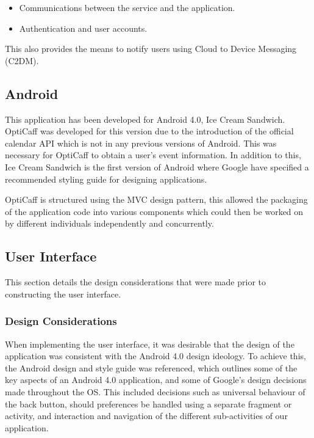 \begin{itemize}[noitemsep,leftmargin=1cm]
	\item{Communications between the service and the application.}
	\item{Authentication and user accounts.}
\end{itemize}

This also provides the means to notify users using Cloud to Device Messaging (C2DM).            

\subsection{Android}
This application has been developed for Android 4.0, Ice Cream Sandwich. OptiCaff was developed for this version due to the introduction of the official calendar API which is not in any previous versions of Android. This was necessary for OptiCaff to obtain a user’s event information. In addition to this, Ice Cream Sandwich is the first version of Android where Google have specified a recommended styling guide for designing applications.

OptiCaff is structured using the MVC design pattern, this allowed the packaging of the application code into various components which could then be worked on by different individuals independently and concurrently.                                                          

\subsection{User Interface}
                   
This section details the design considerations that were made prior to constructing the user interface.
                   
\subsubsection{Design Considerations}
When implementing the user interface, it was desirable that the design of the application was consistent with the Android 4.0 design ideology. To achieve this, the Android design and style guide was referenced, which outlines some of the key aspects of an Android 4.0 application, and some of Google’s design decisions made throughout the OS. This included decisions such as universal behaviour of the back button, should preferences be handled using a separate fragment or activity, and interaction and navigation of the different sub-activities of our application.
                   
